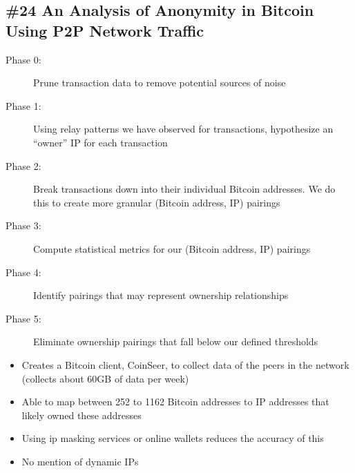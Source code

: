 \subsection{\#24 An Analysis of Anonymity in Bitcoin Using P2P Network Traffic}
\begin{description}
	\item[Phase 0:] Prune transaction data to remove potential sources of noise
	\item[Phase 1:] Using relay patterns we have observed for transactions, hypothesize an ``owner'' IP for each transaction
	\item[Phase 2:] Break transactions down into their individual Bitcoin addresses. We do this to create more granular (Bitcoin address, IP) pairings
	\item[Phase 3:] Compute statistical metrics for our (Bitcoin address, IP) pairings
	\item[Phase 4:] Identify pairings that may represent ownership relationships
	\item[Phase 5:] Eliminate ownership pairings that fall below our defined thresholds
\end{description}
\begin{itemize}
	\item Creates a Bitcoin client, CoinSeer, to collect data of the peers in the network (collects about 60GB of data per week)
	\item Able to map between 252 to 1162 Bitcoin addresses to IP addresses that likely owned these addresses
	\item Using ip masking services or online wallets reduces the accuracy of this
	\item No mention of dynamic IPs
\end{itemize}